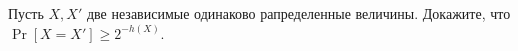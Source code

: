 Пусть $X, X'$ две независимые одинаково рапределенные величины. Докажите, что
$\Pr[X = X'] \ge 2^{-h(X)}$.